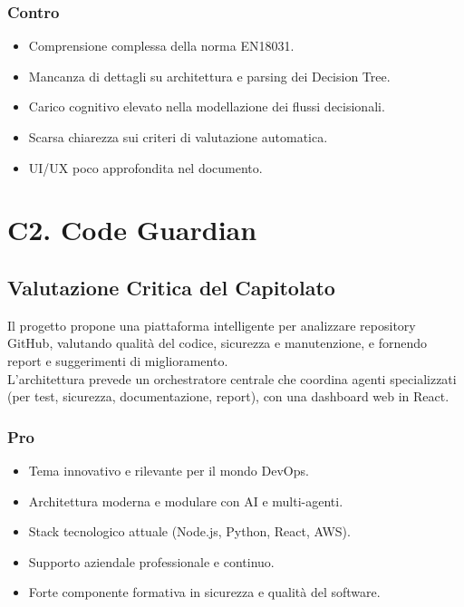 \documentclass[a4paper, 11pt, oneside]{scrartcl} %
\begin{document}
\subsubsection*{Contro}
\begin{itemize}
    \item Comprensione complessa della norma EN18031.
    \item Mancanza di dettagli su architettura e parsing dei Decision Tree.
    \item Carico cognitivo elevato nella modellazione dei flussi decisionali.
    \item Scarsa chiarezza sui criteri di valutazione automatica.
    \item UI/UX poco approfondita nel documento.
\end{itemize}

\section{C2. Code Guardian}
\subsection*{Valutazione Critica del Capitolato}
Il progetto propone una piattaforma intelligente per analizzare repository GitHub, valutando qualità del codice, sicurezza e manutenzione, e fornendo report e suggerimenti di miglioramento.\\
L’architettura prevede un orchestratore centrale che coordina agenti specializzati (per test, sicurezza, documentazione, report), con una dashboard web in React.

\subsubsection*{Pro}
\begin{itemize}
    \item Tema innovativo e rilevante per il mondo DevOps.
    \item Architettura moderna e modulare con AI e multi-agenti.
    \item Stack tecnologico attuale (Node.js, Python, React, AWS).
    \item Supporto aziendale professionale e continuo.
    \item Forte componente formativa in sicurezza e qualità del software.
\end{itemize}
\end{document}
